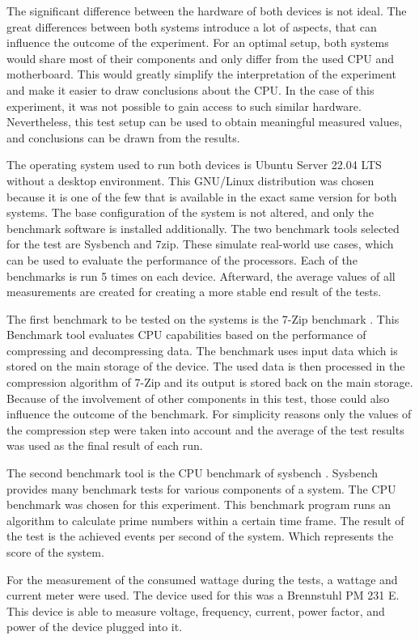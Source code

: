 The significant difference between the hardware of both devices is not ideal.
The great differences between both systems introduce a lot of aspects, that can influence the outcome of the experiment.
For an optimal setup, both systems would share most of their components and
only differ from the used CPU and motherboard. 
This would greatly simplify the interpretation of the experiment and make it easier to draw conclusions about the CPU.
In the case of this experiment, it was not possible to gain access to such similar hardware. 
Nevertheless, this test setup can be used to obtain meaningful measured values, 
and conclusions can be drawn from the results. 


The operating system used to run both devices is Ubuntu Server 22.04 LTS without a desktop environment. 
This GNU/Linux distribution was chosen because it is one of the few that is available in the exact same version for both systems.
\cite{Canonica57:online}
The base configuration of the system is not altered, 
and only the benchmark software is installed additionally.
The two benchmark tools selected for the test are Sysbench and 7zip. 
These simulate real-world use cases, 
which can be used to evaluate the performance of the processors.
Each of the benchmarks is run 5 times on each device. Afterward, the average values of all measurements are created for creating a more stable end result of the tests.



The first benchmark to be tested on the systems is the 7-Zip benchmark \cite{7zipBenchmarkLink}. 
This Benchmark tool evaluates CPU capabilities based on the
performance of compressing and decompressing data.
The benchmark uses input data which is stored 
on the main storage of the device.
The used data is then processed in the compression algorithm 
of 7-Zip and its output is stored back on the main storage.
Because of the involvement of other components in this test, 
those could also influence the outcome of the benchmark. 
For simplicity reasons only the values of the compression step were
taken into account and the average of the test results 
was used as the final result of each run.


The second benchmark tool is the CPU benchmark of 
sysbench \cite{sysbenchGithub}.
Sysbench provides many benchmark tests for various components of a system.
The CPU benchmark was chosen for this experiment. 
This benchmark program runs an algorithm to calculate
prime numbers within a certain time frame.
The result of the test is the achieved events per second of the system.
Which represents the score of the system.



For the measurement of the consumed wattage during the tests,
a wattage and current meter were used. 
The device used for this was a Brennstuhl PM 231 E. 
This device is able to measure voltage, frequency,
current, power factor, and power of the device plugged into it.
\cite{PrimeraL19:online}
